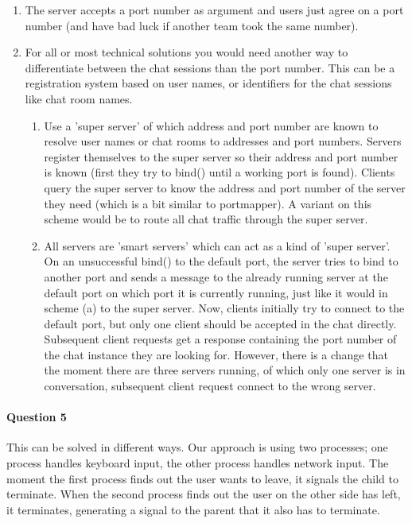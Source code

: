 \documentclass[a4paper,10pt]{article}
\begin{document}
\begin{enumerate}
\item The server accepts a port number as argument and users just agree on a port number (and have bad luck if another team took the same number).
\item For all or most technical solutions you would need another way to differentiate between the chat sessions than the port number. This can be a registration system based on user names, or identifiers for the chat sessions like chat room names.
	\begin{enumerate}
	\item Use a 'super server' of which address and port number are known to resolve user names or chat rooms to addresses and port numbers. Servers register themselves to the super server so their address and port number is known (first they try to bind() until a working port is found). Clients query the super server to know the address and port number of the server they need (which is a bit similar to portmapper). A variant on this scheme would be to route all chat traffic through the super server.
	\item All servers are 'smart servers' which can act as a kind of 'super server'. On an unsuccessful bind() to the default port, the server tries to bind to another port and sends a message to the already running server at the default port on which port it is currently running, just like it would in scheme (a) to the super server. Now, clients initially try to connect to the default port, but only one client should be accepted in the chat directly. Subsequent client requests get a response containing the port number of the chat instance they are looking for. However, there is a change that the moment there are three servers running, of which only one server is in conversation, subsequent client request connect to the wrong server.
	\end{enumerate}
\end{enumerate}

\paragraph{Question 5}
This can be solved in different ways. Our approach is using two processes; one process handles keyboard input, the other process handles network input. The moment the first process finds out the user wants to leave, it signals the child to terminate. When the second process finds out the user on the other side has left, it terminates, generating a signal to the parent that it also has to terminate.
\end{document}
